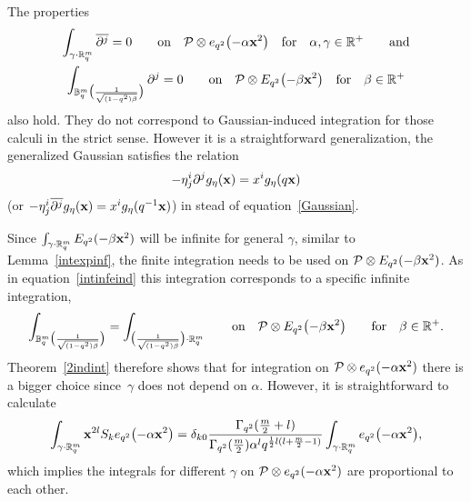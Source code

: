 \documentclass[pdftex]{sigma}
\newcommand{\mR}{\mathbb{R}}
\newcommand{\mB}{\mathbb{B}}
\newcommand{\cP}{\mathcal{P}}
\numberwithin{equation}{section}
\begin{document}
\begin{remark}
\label{gengauss}
The properties
\begin{gather*}
\int_{\gamma\cdot\mR^m_q}\overline{\partial^j}=0\qquad \mbox{on}\quad  \cP\otimes e_{q^2}\big({-}\alpha\bold{x}^2\big)\quad \mbox{for}\quad \alpha,\gamma\in\mR^+\qquad\mbox{and}\\
\int_{\mB^m_q\big(\frac{1}{\sqrt{(1-q^2)\beta}}\big)}\partial^j=0\qquad \mbox{on}\quad \cP\otimes E_{q^2}\big({-}\beta\bold{x}^2\big)\quad\mbox{for}\quad\beta\in\mR^+
\end{gather*}
also hold. They do not correspond to Gaussian-induced integration for those calculi in the strict sense. However it is a straightforward generalization, the generalized Gaussian satisf\/ies the relation
\begin{gather*}
-\eta^i_{ j}\partial^jg_{\eta}(\bold{x}) = x^i g_\eta(q\bold{x})
\end{gather*}
(or $-\eta^i_{ j}\overline{\partial^j}g_{\eta}(\bold{x})=x^i g_\eta(q^{-1}\bold{x})$) in stead of equation~\eqref{Gaussian}.
\end{remark}

Since $\int_{\gamma\cdot\mR^m_q}E_{q^2}(-\beta\bold{x}^2)$ will be inf\/inite for general $\gamma$, similar to Lemma~\ref{intexpinf}, the f\/inite integration needs to be used on $\cP\otimes E_{q^2}(-\beta\bold{x}^2)$. As in equation~\eqref{intinfeind} this integration corresponds to a specif\/ic inf\/inite integration,
\begin{gather*}
\label{intbetainf}
\int_{\mB^m_q\big(\frac{1}{\sqrt{(1-q^2)\beta}}\big)} = \int_{\big(\frac{1}{\sqrt{(1-q^2)\beta}}\big)\cdot\mR^m_q}\qquad\mbox{on}\quad \cP\otimes E_{q^2}\big({-}\beta\bold{x}^2\big)\qquad\mbox{for}\quad\beta\in\mR^+.
\end{gather*}
Theorem~\ref{2indint} therefore shows that for integration on $\cP\otimes e_{q^2}(-\alpha\bold{x}^2)$ there is a bigger choice since~$\gamma$ does not depend on $\alpha$. However, it is straightforward to calculate
\begin{gather*}
\int_{\gamma\cdot\mR^m_q}\bold{x}^{2l}S_ke_{q^2}\big({-}\alpha\bold{x}^2\big)=
\delta_{k0}\frac{\Gamma_{q^2}(\frac{m}{2}+l)}{\Gamma_{q^2}(\frac{m}{2})\alpha^lq^{\frac{1}{2}l(l+\frac{m}{2}-1)}}
\int_{\gamma\cdot\mR^m_q}e_{q^2}\big({-}\alpha\bold{x}^2\big),
\end{gather*}
which implies the integrals for dif\/ferent $\gamma$ on $\cP\otimes e_{q^2}(-\alpha\bold{x}^2)$ are proportional to each other.
\end{document}

